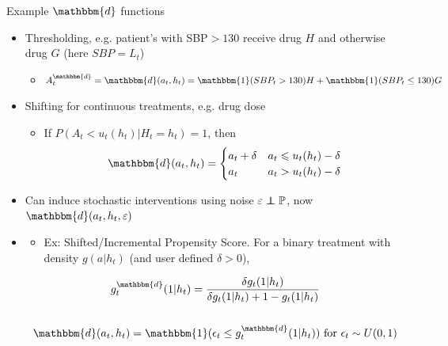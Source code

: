 \documentclass{beamer}
\newcommand{\subitem}[1]{\begin{itemize} \item #1 \end{itemize}}
\newcommand{\PP}{\mathbb{P}}
\newcommand{\Ind}{\mathbbm{1}}
\newcommand{\assign}{\mathbbm{d}}
\newcommand\indp{\protect\mathpalette{\protect\indpT}{\perp}}
\def\indpT#1#2{\mathrel{\rlap{$#1#2$}\mkern2mu{#1#2}}}
\begin{document}
\begin{frame}[allowframebreaks]{Example $\assign$ functions}

    \begin{itemize}\setlength\itemsep{1.5em}
        \item Thresholding, e.g. patient's with SBP$>130$ receive drug $H$ and otherwise drug $G$ (here $SBP = L_t$)
        \subitem{$A_t^\assign = \assign(a_t, h_t) = \Ind(SBP_t>130)H + \Ind(SBP_t\leq 130)G$}

        \item Shifting for continuous treatments, e.g. drug dose 
        \subitem{If $P(A_t < u_t(h_t) | H_t = h_t) = 1$, then 
        \begin{gather*}
            \assign(a_t, h_t) 
            = 
            \begin{cases}
                a_t + \delta &  a_t \leqslant u_t(h_t) - \delta \\ 
                a_t & a_t > u_t(h_t)-\delta
            \end{cases}
        \end{gather*}
        } 

        \newpage 

        \item Can induce stochastic interventions using noise $\varepsilon\indp\PP$, now $\assign(a_t, h_t, \varepsilon)$
        \item 
        \subitem{Ex: Shifted/Incremental Propensity Score. For a binary treatment with density $g(a|h_t)$ (and user defined $\delta>0$),}

        \begin{gather*}
            g_t^\assign(1|h_t) = 
            \frac{\delta g_t(1|h_t)}{\delta g_t(1|h_t) + 1-g_t(1|h_t)}
            \\ \\ 
            \assign(a_t, h_t) = \Ind(\epsilon_t \leq g_t^\assign(1|h_t))
            \text{ for } \epsilon_t \sim U(0,1)
        \end{gather*}



    \end{itemize}


\end{frame}
\end{document}
